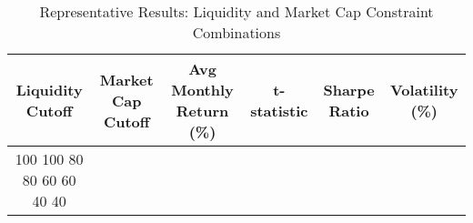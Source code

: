 \begin{table}[htbp]
\caption{Representative Results: Liquidity and Market Cap Constraint Combinations}
\label{tab:representative_constraint_results}
\begin{tabular}{cc|cccc}
\hline
Liquidity Cutoff & Market Cap Cutoff & Avg Monthly Return (\%) & t-statistic & Sharpe Ratio & Volatility (\%) \\
\hline
100%
100%
80%
80%
60%
60%
40%
40%
\hline
\end{tabular}
\end{table}
